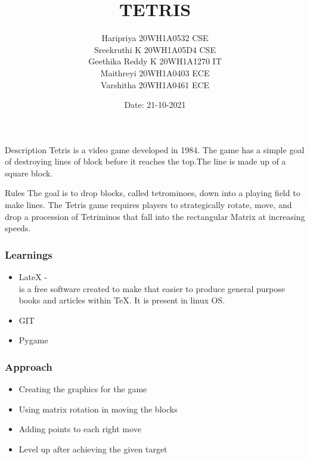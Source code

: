 \documentclass[14pt]{beamer}
\title{TETRIS}
\date{Date: 21-10-2021}
\author[Bvrith]{Haripriya      20WH1A0532  CSE \\ Sreekruthi K  20WH1A05D4 CSE \\ Geethika Reddy K  20WH1A1270  IT \\ Maithreyi  20WH1A0403  ECE \\ Varshitha  20WH1A0461  ECE }
\begin{document}
    \begin{frame}
        \titlepage
    \end{frame}

\begin{frame}{Description}
Tetris is a video game developed in 1984. The game has a simple goal of destroying lines of block before it reaches the top.The line is made up of a square block.



\vskip 1cm
\begin{block}{Rules}
The goal is to drop blocks, called tetrominoes, down into a playing field to make lines.
The Tetris game requires players to strategically rotate, move, and drop a procession of Tetriminos that fall into the rectangular Matrix at increasing speeds.

\end{block}

\end{frame}
\begin{frame}

\frametitle{Learnings}

\begin{itemize}

\item LateX - \\ is a free software created to make that easier to produce general purpose books and articles within TeX. It is present in linux OS. 
\item GIT
\item Pygame

\end{itemize}

\end{frame}

    \begin{frame}
	\frametitle{Approach}
	\begin{itemize}
	    \item Creating the graphics for the game
           \item Using matrix rotation in moving the blocks
           \item Adding points to each right move
           \item Level up after achieving the given target
	\end{itemize}
    \end{frame}
    
\end{document}
